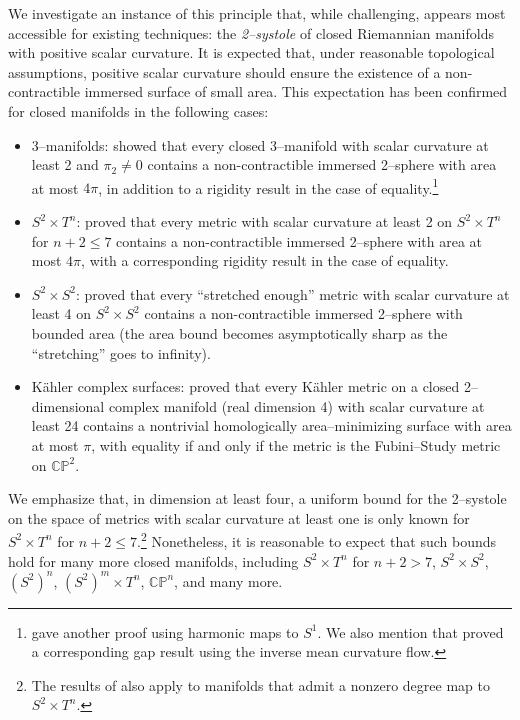 \documentclass[12pt]{amsart}
\theoremstyle{definition}
\numberwithin{equation}{section}
\newcommand{\CP}{\mathbb{C}\mathbb{P}}
\begin{document}
We investigate an instance of this principle that, while challenging, appears most accessible for existing techniques: the \emph{2--systole} of closed Riemannian manifolds with positive scalar curvature. It is expected that, under reasonable topological assumptions, positive scalar curvature should ensure the existence of a non-contractible immersed surface of small area. This expectation has been confirmed for closed manifolds in the following cases:
\begin{itemize}
\item 3--manifolds: \cite{BBN:sys} showed that every closed 3--manifold with scalar curvature at least 2 and $\pi_2 \neq 0$ contains a non-contractible immersed 2--sphere with area at most $4\pi$, in addition to a rigidity result in the case of equality.\footnote{\cite{Stern:intro} gave another proof using harmonic maps to $S^1$. We also mention that \cite{Xu:intro} proved a corresponding gap result using the inverse mean curvature flow.}
\item $S^2 \times T^n$: \cite{Zhu:txs2} proved that every metric with scalar curvature at least 2 on $S^2 \times T^n$ for $n+2 \leq 7$ contains a non-contractible immersed 2--sphere with area at most $4\pi$, with a corresponding rigidity result in the case of equality.
\item $S^2 \times S^2$: \cite{Richard:s2xs2} proved that every ``stretched enough'' metric with scalar curvature at least 4 on $S^2 \times S^2$ contains a non-contractible immersed 2--sphere with bounded area (the area bound becomes asymptotically sharp as the ``stretching'' goes to infinity).
\item K{\"a}hler complex surfaces: \cite{Sha:main} proved that every K{\"a}hler metric on a closed 2--dimensional complex manifold (real dimension 4) with scalar curvature at least 24 contains a nontrivial homologically area--minimizing surface with area at most $\pi$, with equality if and only if the metric is the Fubini--Study metric on $\CP^2$.
\end{itemize}

We emphasize that, in dimension at least four, a uniform bound for the 2--systole on the space of metrics with scalar curvature at least one is only known for $S^2 \times T^n$ for $n+2 \leq 7$.\footnote{The results of \cite{Zhu:txs2} also apply to manifolds that admit a nonzero degree map to $S^2 \times T^n$.} Nonetheless, it is reasonable to expect that such bounds hold for many more closed manifolds, including $S^2 \times T^n$ for $n+2 > 7$, $S^2 \times S^2$, $(S^2)^n$, $(S^2)^m \times T^n$, $\CP^n$, and many more.
\end{document}
